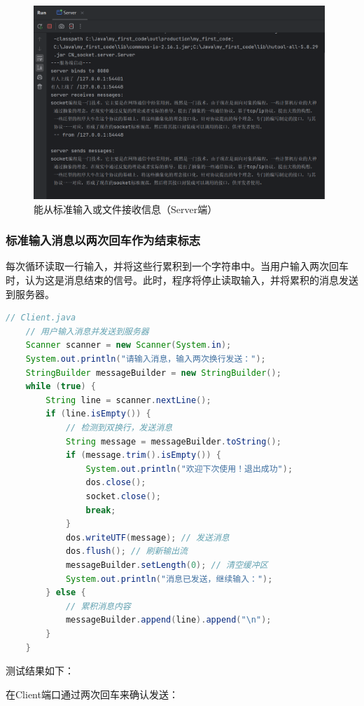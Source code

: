 \documentclass{article}
\begin{document}
	\begin{figure}[H]
		\centering
		\includegraphics[width=11cm]{./images/4.能从标准输入或文件接收信息-Server.png}
		\caption{能从标准输入或文件接收信息（Server端）}
	\end{figure}
	
	\subsubsection{标准输入消息以两次回车作为结束标志}
	
	每次循环读取一行输入，并将这些行累积到一个字符串中。当用户输入两次回车时，认为这是消息结束的信号。此时，程序将停止读取输入，并将累积的消息发送到服务器。
	
	\begin{lstlisting}[language=Java, title=标准输入消息以两次回车作为结束标志, tabsize=4]
	// Client.java
	// 用户输入消息并发送到服务器
	Scanner scanner = new Scanner(System.in);
	System.out.println("请输入消息，输入两次换行发送：");
	StringBuilder messageBuilder = new StringBuilder();
	while (true) {
		String line = scanner.nextLine();
		if (line.isEmpty()) {
			// 检测到双换行，发送消息
			String message = messageBuilder.toString();
			if (message.trim().isEmpty()) {
				System.out.println("欢迎下次使用！退出成功");
				dos.close();
				socket.close();
				break;
			}
			dos.writeUTF(message); // 发送消息
			dos.flush(); // 刷新输出流
			messageBuilder.setLength(0); // 清空缓冲区
			System.out.println("消息已发送，继续输入：");
		} else {
			// 累积消息内容
			messageBuilder.append(line).append("\n");
		}
	}
	\end{lstlisting}
	
	测试结果如下：
	
	在Client端口通过两次回车来确认发送：
	
\end{document}

